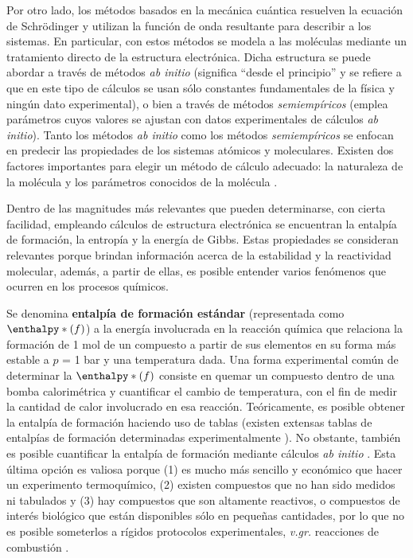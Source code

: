 Por otro lado, los métodos basados en la mecánica cuántica resuelven la ecuación de Schrödinger
y utilizan la función de onda resultante
para describir a los sistemas.
En particular, con estos métodos se modela a las moléculas mediante un tratamiento directo
de la estructura electrónica. Dicha estructura se puede abordar a través de métodos
\textit{ab initio} (significa ``desde el principio'' y se refiere a que en
este tipo de cálculos se usan sólo constantes fundamentales de la física y ningún dato experimental),
o bien a través de métodos  \textit{semiempíricos} (emplea parámetros cuyos valores se ajustan con
datos experimentales de cálculos \textit{ab initio}). Tanto los métodos \textit{ab initio} como los
métodos \textit{semiempíricos} se enfocan en predecir las propiedades de los sistemas atómicos y
moleculares. Existen dos factores importantes para elegir un método de cálculo adecuado: la naturaleza de la molécula y los parámetros conocidos de la molécula \cite{Cuevas2003}. 

Dentro de las magnitudes más relevantes que pueden determinarse, con cierta facilidad, empleando
cálculos de estructura electrónica se encuentran la entalpía de formación, la entropía
y la energía de Gibbs. Estas propiedades se consideran relevantes porque brindan información acerca de la estabilidad y la reactividad molecular, además, a partir de ellas, es posible entender varios fenómenos que ocurren en los procesos químicos.

Se denomina \textbf{entalpía de formación estándar} (representada como $\enthalpy*(f){}$) a la energía involucrada en la reacción química que relaciona la formación de 1 mol de un compuesto a partir de sus elementos en su forma más estable a $p$ = 1 bar y una temperatura dada.
Una forma experimental común de determinar la $\enthalpy*(f){}$ consiste en quemar un compuesto dentro de una bomba calorimétrica y cuantificar el cambio de temperatura,
con el fin de medir la cantidad de calor involucrado en esa reacción. Teóricamente, es posible obtener la entalpía de formación haciendo uso de tablas (existen extensas tablas de entalpías de formación determinadas experimentalmente  \cite{NIST1998, Tajti2004}). No obstante, también es posible cuantificar la entalpía de formación mediante cálculos \textit{ab initio}  \cite{Lewars2016}.
Esta última opción es valiosa porque (1) es mucho más sencillo y económico que hacer un experimento termoquímico, (2) existen compuestos que no han sido medidos ni tabulados y (3) hay compuestos que son altamente reactivos, o compuestos de interés biológico que están disponibles sólo en pequeñas cantidades, por lo que no es posible someterlos a rígidos protocolos experimentales, \textit{v.gr.} reacciones de combustión  \cite{Lewars2016}.

